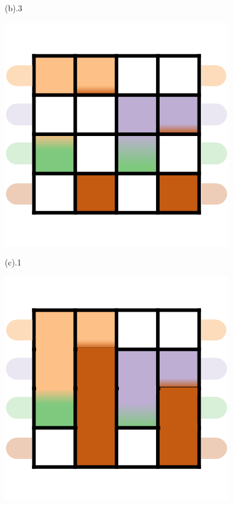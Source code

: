 \begin{figure}[h]
\begin{minipage}{0.24\linewidth}
		\vspace{-1pt}
		\centerline{(b).3}
	\end{minipage}
	\begin{minipage}{0.24\linewidth}
		\centerline{\includegraphics[width=\textwidth]{Fig/31.png}}
		\vspace{-1pt}
		\centerline{(c).1}
		\centerline{\includegraphics[width=\textwidth]{Fig/32.png}}

\end{minipage}
\end{figure}
